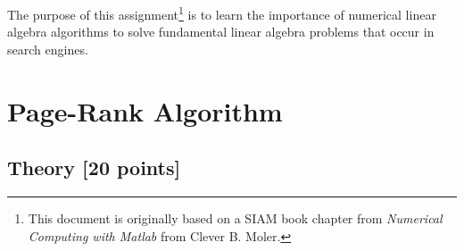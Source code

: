 \documentclass[unicode,11pt,a4paper,oneside,numbers=endperiod,openany]{scrartcl}
\begin{document}
\setassignment
{}

\newline

\assignmentpolicy
The purpose of this assignment\footnote{This document is originally based on a SIAM book chapter from \textsl{Numerical Computing with Matlab} from  Clever B. Moler.} is to learn the importance of numerical linear algebra algorithms to solve fundamental  linear algebra problems that occur in search engines.



\section{Page-Rank Algorithm}

\subsection{Theory [20 points]}
\end{document}
